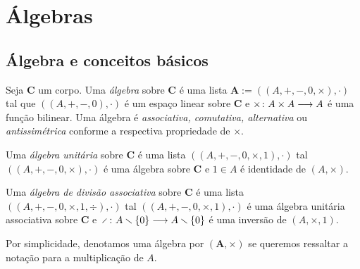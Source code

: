 \chapter{Álgebras}

\section{Álgebra e conceitos básicos}


\begin{definition}
Seja $\bm C$ um corpo. Uma \emph{álgebra} sobre $\bm C$ é uma lista $\bm{A} := ((A,+,-,0,\times),\cdot)$ tal que $((A,+,-,0),\cdot)$ é um espaço linear sobre $\bm C$ e ${\times}\colon {A \times A} \longrightarrow {A}$ é uma função bilinear. Uma álgebra é \emph{associativa, comutativa, alternativa} ou \emph{antissimétrica} conforme a respectiva propriedade de $\times$.

Uma \emph{álgebra unitária} sobre $\bm C$ é uma lista $((A,+,-,0,\times,1),\cdot)$ tal $((A,+,-,0,\times),\cdot)$ é uma álgebra sobre $\bm C$ e $1 \in A$ é identidade de $(A,\times)$.

Uma \emph{álgebra de divisão associativa} sobre $\bm C$ é uma lista $((A,+,-,0,\times,1,\div),\cdot)$ tal $((A,+,-,0,\times,1),\cdot)$ é uma álgebra unitária associativa sobre $\bm C$ e $\fun{\div}{A \setminus \{0\}}{A \setminus \{0\}}$ é uma inversão de $(A,\times,1)$.
\end{definition}

Por simplicidade, denotamos uma álgebra por $(\bm A,\times)$ se queremos ressaltar a notação para a multiplicação de $A$.

